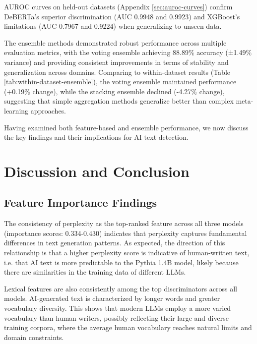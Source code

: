 \documentclass[11pt]{article}
\begin{document}
AUROC curves on held-out datasets (Appendix \ref{sec:auroc-curves}) confirm DeBERTa's superior discrimination (AUC 0.9948 and 0.9923) and XGBoost's limitations (AUC 0.7967 and 0.9224) when generalizing to unseen data.

The ensemble methods demonstrated robust performance across multiple evaluation metrics, with the voting ensemble achieving 88.89\% accuracy (±1.49\% variance) and providing consistent improvements in terms of stability and generalization across domains. Comparing to within-dataset results (Table \ref{tab:within-dataset-ensemble}), the voting ensemble maintained performance (+0.19\% change), while the stacking ensemble declined (-4.27\% change), suggesting that simple aggregation methods generalize better than complex meta-learning approaches.

Having examined both feature-based and ensemble performance, we now discuss the key findings and their implications for AI text detection.

\section{Discussion and Conclusion}
\label{sec:discussion-conclusion}

\subsection{Feature Importance Findings}
\label{sec:feature-importance-discussion}
The consistency of perplexity as the top-ranked feature across all three models (importance scores: 0.334-0.430) indicates that perplexity captures fundamental differences in text generation patterns. As expected, the direction of this relationship is that a higher perplexity score is indicative of human-written text, i.e. that AI text is more predictable to the Pythia 1.4B model, likely because there are similarities in the training data of different LLMs.

Lexical features are also consistently among the top discriminators across all models. AI-generated text is characterized by longer words and greater vocabulary diversity. This shows that modern LLMs employ a more varied vocabulary than human writers, possibly reflecting their large and diverse training corpora, where the average human vocabulary reaches natural limits and domain constraints.
\end{document}
